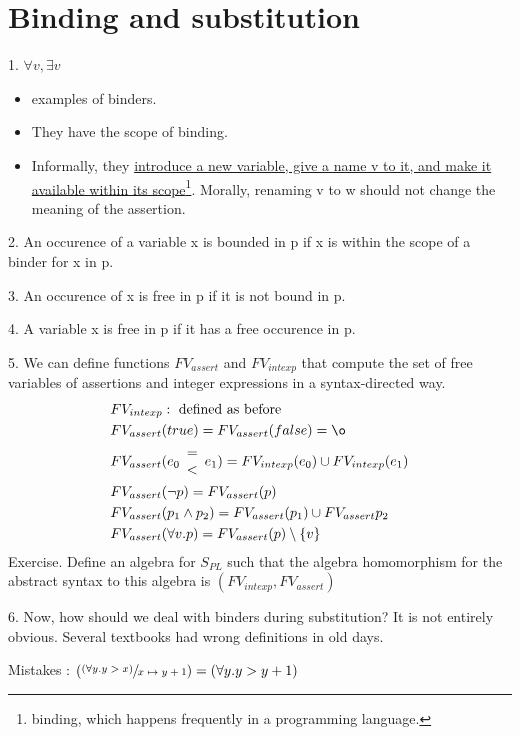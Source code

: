 \documentclass{report}[12pt]
\begin{document}
\section{Binding and substitution}
1. $\forall v, \exists v$
\begin{itemize}
    \item examples of binders.
    \item They have the scope of binding.
    \item Informally, they \underline{introduce a new variable, give a name v to it, and make it available within its scope}\footnote{binding, which happens frequently in a programming language.}. Morally, renaming v to w should not change the meaning of the assertion.
\end{itemize}
2. An occurence of a variable x is bounded in p if x is within the scope of a binder for x in p.

3. An occurence of x is free in p if it is not bound in p.

4. A variable x is free in p if it has a free occurence in p.

5. We can define functions $FV_{assert}$ and $FV_{intexp}$ that compute the set of free variables of assertions and integer expressions in a syntax-directed way.
\begin{align*}
    &FV_{intexp} : \text{ defined as before} \\
    &FV_{assert}(true) = FV_{assert}(false) = \o \\
    &FV_{assert}(e_0 \begin{array}{c}= \\ <\end{array} e_1) = FV_{intexp}(e_0) \cup FV_{intexp}(e_1) \\
    &FV_{assert}(\neg p) = FV_{assert}(p) \\
    &FV_{assert}(p_1 \wedge p_2) = FV_{assert}(p_1) \cup FV_{assert}{p_2} \\
    &FV_{assert}(\forall v. p) = FV_{assert}(p) \setminus \{v\}
\end{align*}
Exercise. Define an algebra for $S_{PL}$ such that the algebra homomorphism for the abstract syntax to this algebra is $(FV_{intexp}, FV_{assert})$

6. Now, how should we deal with binders during substitution? It is not entirely obvious. Several textbooks had wrong definitions in old days.

Mistakes : $(\sfrac{(\forall y. y > x)}{x\mapsto y+1})=(\forall y.y>y+1)$
\end{document}
